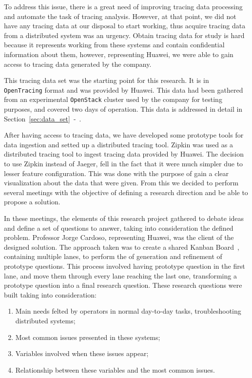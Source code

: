To address this issue, there is a great need of improving tracing data processing and automate the task of tracing analysis. However, at that point, we did not have any tracing data at our disposal to start working, thus acquire tracing data from a distributed system was an urgency. Obtain tracing data for study is hard because it represents working from these systems and contain confidential information about them, however, representing Huawei, we were able to gain access to tracing data generated by the company.

This tracing data set was the starting point for this research. It is in \texttt{OpenTracing} format and was provided by Huawei. This data had been gathered from an experimental \texttt{OpenStack} cluster used by the company for testing purposes, and covered two days of operation. This data is addressed in detail in Section~\ref{sec:data_set}~-~.

After having access to tracing data, we have developed some prototype tools for data ingestion and setted up a distributed tracing tool. Zipkin was used as a distributed tracing tool to ingest tracing data provided by Huawei. The decision to use Zipkin instead of Jaeger, fell in the fact that it were much simpler due to lesser feature configuration. This was done with the purpose of gain a clear visualization about the data that were given. From this we decided to perform several meetings with the objective of defining a research direction and be able to propose a solution.

In these meetings, the elements of this research project gathered to debate ideas and define a set of questions to answer, taking into consideration the defined problem. Professor Jorge Cardoso, representing Huawei, was the client of the designed solution. The approach taken was to create a shared Kanban Board~\cite{Ikonen2011}, containing multiple lanes, to perform the of generation and refinement of prototype questions. This process involved having prototype question in the first lane, and move them through every lane reaching the last one, transforming a prototype question into a final research question. These research questions were built taking into consideration:

\begin{enumerate}
    \item Main needs felted by operators in normal day-to-day tasks, troubleshooting distributed systems;
    \item Most common issues presented in these systems;
    \item Variables involved when these issues appear;
    \item Relationship between these variables and the most common issues.
\end{enumerate}

